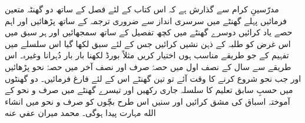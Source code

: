 \begin{urduprose}
\pstart
مدرّسينِ كرام سے گذارش ہے كہ اس كتاب كے لئے فصل كے ساتھ دو گھنٹہ متعين فرمائيں پہلے گھنٹے ميں سرسرى انداز سے ضرورى ترجمہ كے ساتھ پڑھائيں اور اہم حصے ياد كرائيں دوسرے گھنٹے ميں كچھ تفصيل كے ساتھ سمجھائيں اور ہر سبق ميں اس غرض كو طلبہ كے ذہن نشيں كرائيں جس كے لئے سبق لكھا گيا اس سلسلے ميں تفہيم كے جو طريقے مناسب ہوں اختيار كريں مثلاً بورڈ  لكھنا بار بار دُہرانا وغيرہ۔ اس طريقے سے سال كے نصف اول ميں حصۂ صرف اور نصف آخر ميں حصۂ نحو پڑھائيں اور جب نحو شروع كرنے كا وقت آئے تو تين گھنٹے اس كے لئے فارغ فرمائيں۔ دو گھنٹوں ميں حسبِ سابق تعليم كا سلسلہ جارى ركھيں اور تيسرے گھنٹے ميں صرف و نحو كے آموختہ اسباق كى مشق كرائيں اور سنيں اس طرح بچّوں كو صرف و نحو ميں انشاء الله مہارت پيدا ہوگى۔
\pend
\pstart\raggedleft
محمد ميران عفي عنه
\pend
\end{urduprose}
